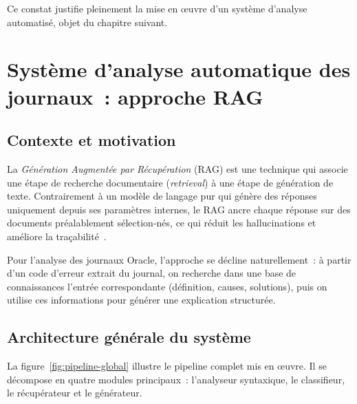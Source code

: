 \documentclass[12pt,a4paper]{report}
\begin{document}
Ce constat justifie pleinement la mise en \oe{}uvre d'un syst\`eme d'analyse automatis\'e,
objet du chapitre suivant.

\chapter{Syst\`eme d'analyse automatique des journaux~: approche RAG}

\section{Contexte et motivation}

La \emph{G\'en\'eration Augment\'ee par R\'ecup\'eration} (RAG) est une technique qui
associe une \'etape de recherche documentaire (\emph{retrieval}) \`a une \'etape de
g\'en\'eration de texte. Contrairement \`a un mod\`ele de langage pur qui g\'en\`ere des
r\'eponses uniquement depuis ses param\`etres internes, le RAG ancre chaque r\'eponse
sur des documents pr\'ealablement s\'election-n\'es, ce qui r\'eduit les hallucinations
et am\'eliore la tra\c cabilit\'e~\cite{raglog2024,lograg2024}.

Pour l'analyse des journaux Oracle, l'approche se d\'ecline naturellement~: \`a partir
d'un code d'erreur extrait du journal, on recherche dans une base de connaissances
l'entr\'ee correspondante (d\'efinition, causes, solutions), puis on utilise ces
informations pour g\'en\'erer une explication structur\'ee.

\section{Architecture g\'en\'erale du syst\`eme}

La figure~\ref{fig:pipeline-global} illustre le pipeline complet mis en \oe{}uvre. Il
se d\'ecompose en quatre modules principaux~: l'analyseur syntaxique, le classifieur,
le r\'ecup\'erateur et le g\'en\'erateur.
\end{document}
